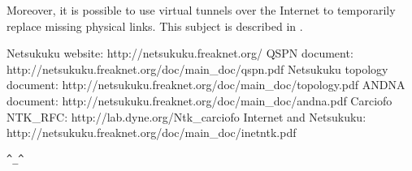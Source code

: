 \documentclass[a4paper]{article}
\newcommand{\href}[2]{ #1 }
\begin{document}
Moreover, it is possible to use virtual tunnels over the Internet to temporarily
replace missing physical links. This subject is described in \cite{inetdoc}.


\begin{thebibliography}{99}
	 Netsukuku website:
		\href{http://netsukuku.freaknet.org/}{http://netsukuku.freaknet.org/}
	 QSPN document:
		\href{http://netsukuku.freaknet.org/doc/main\_doc/qspn.pdf}{qspn.pdf}
	 Netsukuku topology document:
		\href{http://netsukuku.freaknet.org/doc/main\_doc/topology.pdf}{topology.pdf}
	 ANDNA document:
		\href{http://netsukuku.freaknet.org/doc/main\_doc/andna.pdf}{andna.pdf}
	 Carciofo NTK\_RFC:
		\href{http://lab.dyne.org/Ntk\_carciofo}{Carciofo}
	  Internet and Netsukuku:
		\href{http://netsukuku.freaknet.org/doc/main\_doc/inetntk.pdf}{inetntk.pdf}
	

\end{thebibliography}
\newpage

\begin{center}
\verb|^_^|
\end{center}
\end{document}
